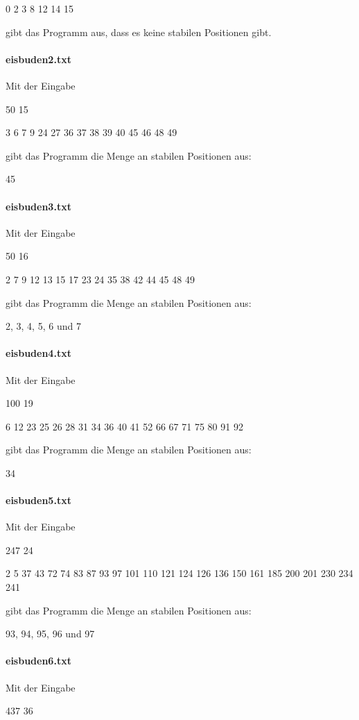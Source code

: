 \documentclass[a4paper,10pt,ngerman]{scrartcl}
\begin{document}
0 2 3 8 12 14 15

gibt das Programm aus, dass es keine stabilen Positionen gibt.

\paragraph{eisbuden2.txt}
Mit der Eingabe

50 15

3 6 7 9 24 27 36 37 38 39 40 45 46 48 49

gibt das Programm die Menge an stabilen Positionen aus:

45

\paragraph{eisbuden3.txt}
Mit der Eingabe

50 16

2 7 9 12 13 15 17 23 24 35 38 42 44 45 48 49

gibt das Programm die Menge an stabilen Positionen aus:

2, 3, 4, 5, 6 und 7

\paragraph{eisbuden4.txt}
Mit der Eingabe

100 19

6 12 23 25 26 28 31 34 36 40 41 52 66 67 71 75 80 91 92

gibt das Programm die Menge an stabilen Positionen aus:

34

\paragraph{eisbuden5.txt}
Mit der Eingabe

247 24

2 5 37 43 72 74 83 87 93 97 101 110 121 124 126 136 150 161 185 200 201 230 234 241

gibt das Programm die Menge an stabilen Positionen aus:

93, 94, 95, 96 und 97

\paragraph{eisbuden6.txt}
Mit der Eingabe

437 36
\end{document}
